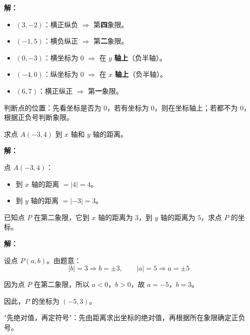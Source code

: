\documentclass[12pt, a4paper]{ctexart}
\begin{document}
\textbf{解：}

\begin{itemize}[leftmargin=1.5em]
  \item $(3, -2)$：横正纵负 $\Rightarrow$ 第\textbf{四}象限。
  \item $(-1, 5)$：横负纵正 $\Rightarrow$ 第\textbf{二}象限。
  \item $(0, -3)$：横坐标为 $0$ $\Rightarrow$ 在 $y$ \textbf{轴上}（负半轴）。
  \item $(-4, 0)$：纵坐标为 $0$ $\Rightarrow$ 在 $x$ \textbf{轴上}（负半轴）。
  \item $(6, 7)$：横正纵正 $\Rightarrow$ 第\textbf{一}象限。
\end{itemize}

\begin{tipbox}[方法总结]
判断点的位置：先看坐标是否为 $0$，若有坐标为 $0$，则在坐标轴上；若都不为 $0$，根据正负号判断象限。
\end{tipbox}

\bigskip

\begin{examplebox}[【例题2】点到坐标轴的距离]
求点 $A(-3, 4)$ 到 $x$ 轴和 $y$ 轴的距离。
\end{examplebox}

\textbf{解：}

点 $A(-3, 4)$：
\begin{itemize}[leftmargin=1.5em]
  \item 到 $x$ 轴的距离 $= |4| = 4$。
  \item 到 $y$ 轴的距离 $= |-3| = 3$。
\end{itemize}

\bigskip

\begin{examplebox}[【例题3】根据距离求坐标]
已知点 $P$ 在第二象限，它到 $x$ 轴的距离为 $3$，到 $y$ 轴的距离为 $5$，求点 $P$ 的坐标。
\end{examplebox}

\textbf{解：}

设点 $P(a, b)$。由题意：
$$|b| = 3 \Rightarrow b = \pm 3, \qquad |a| = 5 \Rightarrow a = \pm 5$$

因为点 $P$ 在第二象限，所以 $a < 0$，$b > 0$，故 $a = -5$，$b = 3$。

因此，$P$ 的坐标为 $\boxed{(-5, 3)}$。

\begin{tipbox}[方法总结]
"先绝对值，再定符号"：先由距离求出坐标的绝对值，再根据所在象限确定正负号。
\end{tipbox}
\end{document}
